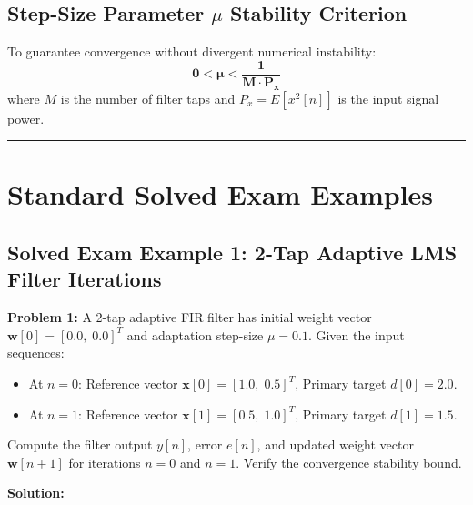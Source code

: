 \documentclass[11pt,a4paper]{article}
\begin{document}
\subsection{Step-Size Parameter \texorpdfstring{$\mu$}{mu} Stability Criterion}
To guarantee convergence without divergent numerical instability:
\begin{equation}
\mathbf{0 < \mu < \frac{1}{M \cdot P_x}}
\end{equation}
where $M$ is the number of filter taps and $P_x = E[x^2[n]]$ is the input signal power.

\noindent\rule{\textwidth}{0.5pt}

\section{Standard Solved Exam Examples}

\subsection*{Solved Exam Example 1: 2-Tap Adaptive LMS Filter Iterations}

\textbf{Problem 1:} A 2-tap adaptive FIR filter has initial weight vector $\mathbf{w}[0] = [0.0, \; 0.0]^T$ and adaptation step-size $\mu = 0.1$. Given the input sequences:
\begin{itemize}
    \item At $n = 0$: Reference vector $\mathbf{x}[0] = [1.0, \; 0.5]^T$, Primary target $d[0] = 2.0$.
    \item At $n = 1$: Reference vector $\mathbf{x}[1] = [0.5, \; 1.0]^T$, Primary target $d[1] = 1.5$.
\end{itemize}
Compute the filter output $y[n]$, error $e[n]$, and updated weight vector $\mathbf{w}[n+1]$ for iterations $n = 0$ and $n = 1$. Verify the convergence stability bound.

\vspace{1mm}
\noindent\textbf{Solution:}
\end{document}
